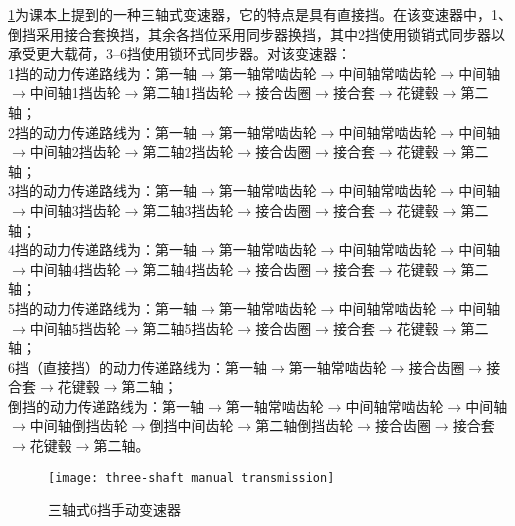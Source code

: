\documentclass[UTF8]{ctexart}
\numberwithin{figure}{section}
\numberwithin{table}{section}
\begin{document}
\cref{three-shaft manual transmission}为课本上提到的一种三轴式变速器，它的特点是具有直接挡。在该变速器中，1、倒挡采用接合套换挡，其余各挡位采用同步器换挡，其中2挡使用锁销式同步器以承受更大载荷，\numrange[range-phrase = $\,\sim\,$]{3}{6}挡使用锁环式同步器。对该变速器：\\
1挡的动力传递路线为：第一轴$\rightarrow$第一轴常啮齿轮$\rightarrow$中间轴常啮齿轮$\rightarrow$中间轴$\rightarrow$中间轴1挡齿轮$\rightarrow$第二轴1挡齿轮$\rightarrow$接合齿圈$\rightarrow$接合套$\rightarrow$花键毂$\rightarrow$第二轴；\\
2挡的动力传递路线为：第一轴$\rightarrow$第一轴常啮齿轮$\rightarrow$中间轴常啮齿轮$\rightarrow$中间轴$\rightarrow$中间轴2挡齿轮$\rightarrow$第二轴2挡齿轮$\rightarrow$接合齿圈$\rightarrow$接合套$\rightarrow$花键毂$\rightarrow$第二轴；\\
3挡的动力传递路线为：第一轴$\rightarrow$第一轴常啮齿轮$\rightarrow$中间轴常啮齿轮$\rightarrow$中间轴$\rightarrow$中间轴3挡齿轮$\rightarrow$第二轴3挡齿轮$\rightarrow$接合齿圈$\rightarrow$接合套$\rightarrow$花键毂$\rightarrow$第二轴；\\
4挡的动力传递路线为：第一轴$\rightarrow$第一轴常啮齿轮$\rightarrow$中间轴常啮齿轮$\rightarrow$中间轴$\rightarrow$中间轴4挡齿轮$\rightarrow$第二轴4挡齿轮$\rightarrow$接合齿圈$\rightarrow$接合套$\rightarrow$花键毂$\rightarrow$第二轴；\\
5挡的动力传递路线为：第一轴$\rightarrow$第一轴常啮齿轮$\rightarrow$中间轴常啮齿轮$\rightarrow$中间轴$\rightarrow$中间轴5挡齿轮$\rightarrow$第二轴5挡齿轮$\rightarrow$接合齿圈$\rightarrow$接合套$\rightarrow$花键毂$\rightarrow$第二轴；\\
6挡（直接挡）的动力传递路线为：第一轴$\rightarrow$第一轴常啮齿轮$\rightarrow$接合齿圈$\rightarrow$接合套$\rightarrow$花键毂$\rightarrow$第二轴；\\
倒挡的动力传递路线为：第一轴$\rightarrow$第一轴常啮齿轮$\rightarrow$中间轴常啮齿轮$\rightarrow$中间轴$\rightarrow$中间轴倒挡齿轮$\rightarrow$倒挡中间齿轮$\rightarrow$第二轴倒挡齿轮$\rightarrow$接合齿圈$\rightarrow$接合套$\rightarrow$花键毂$\rightarrow$第二轴。

\begin{figure}[htbp]
	\centering
	\begin{minipage}[b]{\textwidth}
		\centering
		\texttt{[image: three-shaft manual transmission]}
		\caption{三轴式6挡手动变速器}
		\label{three-shaft manual transmission}
	\end{minipage}
\end{figure}
\end{document}
